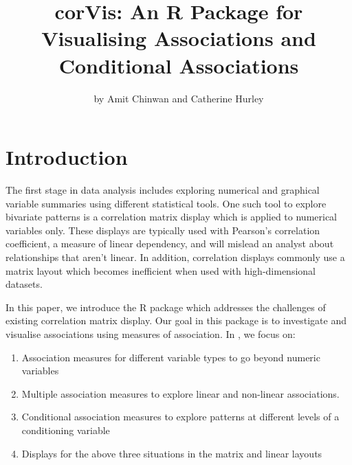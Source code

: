 \title{corVis: An R Package for Visualising Associations and Conditional Associations}
\author{by Amit Chinwan and Catherine Hurley}

\maketitle


\hypertarget{introduction}{%
\section{Introduction}\label{introduction}}

The first stage in data analysis includes exploring numerical and graphical variable summaries using different statistical tools. One such tool to explore bivariate patterns is a correlation matrix display which is applied to numerical variables only. These displays are typically used with Pearson's correlation coefficient, a measure of linear dependency, and will mislead an analyst about relationships that aren't linear. In addition, correlation displays commonly use a matrix layout which becomes inefficient when used with high-dimensional datasets.

In this paper, we introduce the R package  which addresses the challenges of existing correlation matrix display. Our goal in this package is to investigate and visualise associations using measures of association. In , we focus on:

\begin{enumerate}
\def\labelenumi{\arabic{enumi}.}
\tightlist
\item
  Association measures for different variable types to go beyond numeric variables
\item
  Multiple association measures to explore linear and non-linear associations.
\item
  Conditional association measures to explore patterns at different levels of a conditioning variable
\item
  Displays for the above three situations in the matrix and linear layouts
\end{enumerate}

